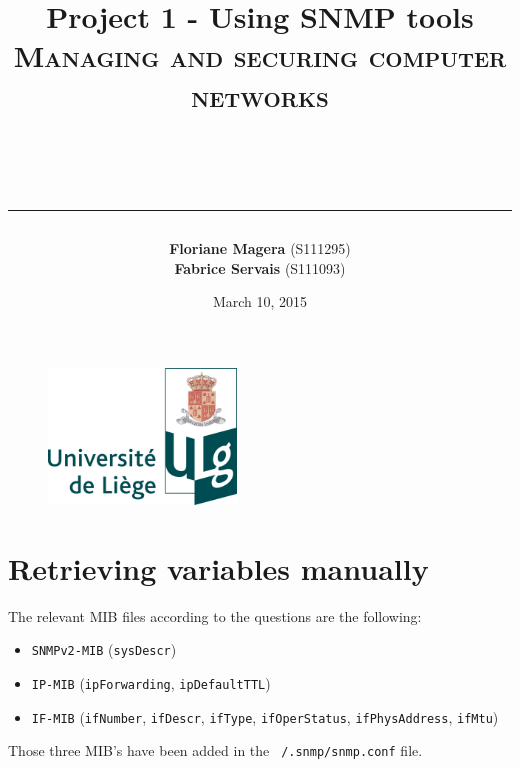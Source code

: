 \documentclass[a4paper,titlepage]{article}
\begin{document}
\begin{titlepage}

\begin{figure}
\centering
\includegraphics[width=5cm]{logo-ulg.png}
\end{figure}



\title{
\vspace{0.2cm}
\LARGE{\textbf{Project 1 - Using SNMP tools}} \\ \textsc{Managing and securing computer networks}
\author{\textbf{Floriane Magera} \small{(S111295})\\\textbf{Fabrice Servais} \small{(S111093})}\\
\date{March 10, 2015}
\rule{15cm}{1.5pt}
}

\end{titlepage}

\pagestyle{fancy}

\maketitle

\section{Retrieving variables manually}
The relevant MIB files according to the questions are the following:
\begin{itemize}
	\item \texttt{SNMPv2-MIB} (\texttt{sysDescr})
	\item \texttt{IP-MIB} (\texttt{ipForwarding}, \texttt{ipDefaultTTL})
	\item \texttt{IF-MIB} (\texttt{ifNumber}, \texttt{ifDescr}, \texttt{ifType}, \texttt{ifOperStatus}, \texttt{ifPhysAddress}, \texttt{ifMtu})
\end{itemize}

Those three MIB's have been added in the \texttt{~/.snmp/snmp.conf} file.
\end{document}
